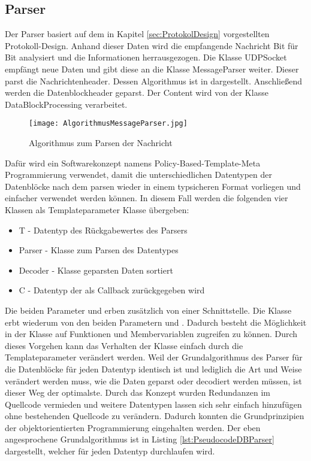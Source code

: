 \subsection{Parser}

Der Parser basiert auf dem in Kapitel \ref{sec:ProtokolDesign}
vorgestellten Protokoll-Design.
Anhand dieser Daten wird die empfangende Nachricht Bit für Bit analysiert
und die Informationen herrausgezogen. 
Die Klasse UDPSocket empfängt neue Daten und gibt diese an
die Klasse MessageParser weiter. Dieser parst die Nachrichtenheader. Dessen
Algorithmus ist in  dargestellt.
Anschließend werden die Datenblockheader geparst. Der Content wird von der
Klasse DataBlockProcessing verarbeitet.

\begin{figure}[H]
\centering
\texttt{[image: AlgorithmusMessageParser.jpg]}
\caption{Algorithmus zum Parsen der Nachricht}
\label{fig:AlgorithmusMessageParser}
\end{figure}

Dafür wird ein Softwarekonzept namens Policy-Based-Template-Meta Programmierung
 verwendet, damit die unterschiedlichen Datentypen der
Datenblöcke nach dem parsen wieder in einem typsicheren Format vorliegen und
einfacher verwendet werden können.
In diesem Fall werden die folgenden vier Klassen als Templateparameter Klasse
übergeben:

\begin{itemize}
\item T - Datentyp des Rückgabewertes des Parsers
\item Parser - Klasse zum Parsen des Datentypes
\item Decoder - Klasse geparsten Daten sortiert
\item C - Datentyp der als Callback zurückgegeben wird
\end{itemize}

Die beiden Parameter  und  erben zusätzlich von einer
Schnittstelle. Die Klasse  erbt
wiederum von den beiden Parametern  und .
Dadurch besteht die Möglichkeit in der Klasse auf Funktionen und
Membervariablen zugreifen zu können.
Durch dieses Vorgehen kann das Verhalten der Klasse einfach durch die
Templateparameter verändert werden. Weil der Grundalgorithmus des Parser für
die Datenblöcke für jeden Datentyp identisch ist und lediglich die Art und
Weise verändert werden muss, wie die Daten geparst oder decodiert werden müssen,
ist dieser Weg der optimalste. Durch das Konzept wurden
Redundanzen im Quellcode vermieden und weitere Datentypen lassen sich
sehr einfach hinzufügen ohne bestehenden Quellcode zu verändern. Dadurch konnten
die Grundprinzipien der objektorientierten Programmierung 
eingehalten werden.
Der eben angesprochene Grundalgorithmus ist in Listing 
\ref{lst:PseudocodeDBParser} dargestellt, welcher für jeden Datentyp
durchlaufen wird.

